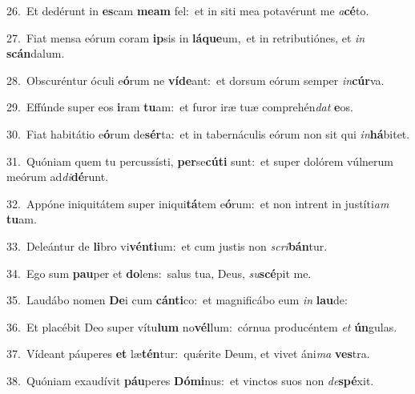 {\numbfont\textcolor{\numbcolor}{26.}}~Et dedérunt in \textbf{es}\-cam \textbf{me}\-\textbf{am} fel:~\star et in siti mea potavérunt me \textit{a}\-\textbf{cé}to.\par
{\numbfont\textcolor{\numbcolor}{27.}}~Fiat mensa eórum coram \textbf{ip}\-sis in \textbf{lá}\-\textbf{que}um,~\star et in retributiónes, et \textit{in} \textbf{scán}\-dalum.\par
{\numbfont\textcolor{\numbcolor}{28.}}~Obscuréntur óculi e\-\textbf{ó}\-rum ne \textbf{ví}\-\textbf{de}ant:~\star et dorsum eórum semper \textit{in}\-\textbf{cúr}va.\par
{\numbfont\textcolor{\numbcolor}{29.}}~Effúnde super eos \textbf{i}\-ram \textbf{tu}\-am:~\star et furor iræ tuæ comprehén\textit{dat} \textbf{e}\-os.\par
{\numbfont\textcolor{\numbcolor}{30.}}~Fiat habitátio e\-\textbf{ó}\-rum de\-\textbf{sér}\-ta:~\star et in tabernáculis eórum non sit qui \textit{in}\-\textbf{há}bitet.\par
{\numbfont\textcolor{\numbcolor}{31.}}~Quóniam quem tu percussísti, \textbf{per}\-se\-\textbf{cú}\-\textbf{ti} sunt:~\star et super dolórem vúlnerum meórum ad\-\textit{di}\-\textbf{dé}runt.\par
{\numbfont\textcolor{\numbcolor}{32.}}~Appóne iniquitátem super iniqui\-\textbf{tá}\-tem e\-\textbf{ó}\-rum:~\star et non intrent in justíti\textit{am} \textbf{tu}\-am.\par
{\numbfont\textcolor{\numbcolor}{33.}}~Deleántur de \textbf{li}\-bro vi\-\textbf{vén}\-\textbf{ti}um:~\star et cum justis non \textit{scri}\-\textbf{bán}tur.\par
{\numbfont\textcolor{\numbcolor}{34.}}~Ego sum \textbf{pau}\-per et \textbf{do}\-lens:~\star salus tua, Deus, \textit{su}\-\textbf{scé}pit me.\par
{\numbfont\textcolor{\numbcolor}{35.}}~Laudábo nomen \textbf{De}\-i cum \textbf{cán}\-\textbf{ti}co:~\star et magnificábo eum \textit{in} \textbf{lau}\-de:\par
{\numbfont\textcolor{\numbcolor}{36.}}~Et placébit Deo super vítu\textbf{lum} no\-\textbf{vél}\-lum:~\star córnua producéntem \textit{et} \textbf{ún}\-gulas.\par
{\numbfont\textcolor{\numbcolor}{37.}}~Vídeant páuperes \textbf{et} læ\-\textbf{tén}\-tur:~\star quǽrite Deum, et vivet áni\textit{ma} \textbf{ves}\-tra.\par
{\numbfont\textcolor{\numbcolor}{38.}}~Quóniam exaudívit \textbf{páu}\-peres \textbf{Dó}\-\textbf{mi}nus:~\star et vinctos suos non \textit{de}\-\textbf{spé}xit.\par
